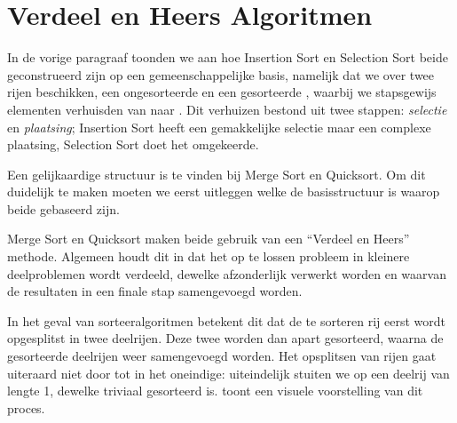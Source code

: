 \section{Verdeel en Heers Algoritmen}
In de vorige paragraaf toonden we aan hoe Insertion Sort en Selection Sort
beide geconstrueerd zijn op een gemeenschappelijke basis, namelijk
dat we over twee rijen beschikken, een ongesorteerde  en een gesorteerde ,
waarbij we stapsgewijs elementen verhuisden van  naar .
Dit verhuizen bestond uit twee stappen: \emph{selectie} en \emph{plaatsing};
Insertion Sort heeft een gemakkelijke selectie maar een complexe plaatsing,
Selection Sort doet het omgekeerde.

Een gelijkaardige structuur is te vinden bij Merge Sort en Quicksort. Om dit duidelijk te maken
moeten we eerst uitleggen welke de basisstructuur is waarop beide gebaseerd zijn.

Merge Sort en Quicksort maken beide gebruik van een ``Verdeel en Heers'' methode.
Algemeen houdt dit in dat het op te lossen probleem in kleinere deelproblemen
wordt verdeeld, dewelke afzonderlijk verwerkt worden en waarvan de resultaten
in een finale stap samengevoegd worden.

In het geval van sorteeralgoritmen betekent dit dat de te sorteren rij
eerst wordt opgesplitst in twee deelrijen. Deze twee worden dan apart
gesorteerd, waarna de gesorteerde deelrijen
weer samengevoegd worden.
Het opsplitsen van rijen gaat uiteraard niet door tot in het oneindige:
uiteindelijk stuiten we op een deelrij van lengte 1, dewelke
triviaal gesorteerd is.
 toont een visuele voorstelling van dit proces.


